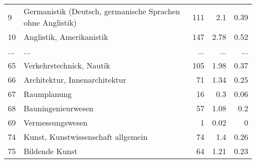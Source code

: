 \begin{longtable}{lXrrr}
        9 & \multicolumn{1}{X}{Germanistik (Deutsch, germanische Sprachen ohne Anglistik)} & %
          \num{111} &
          \num[round-mode=places,round-precision=2]{2,1} &
          \num[round-mode=places,round-precision=2]{0,39} \\
        10 & \multicolumn{1}{X}{Anglistik, Amerikanistik} & %
          \num{147} &
          \num[round-mode=places,round-precision=2]{2,78} &
          \num[round-mode=places,round-precision=2]{0,52} \\
       ... & ... & ... & ... & ... \\
        65 & \multicolumn{1}{X}{Verkehrstechnick, Nautik} & %
          \num{105} &
          \num[round-mode=places,round-precision=2]{1,98} &
          \num[round-mode=places,round-precision=2]{0,37} \\

        66 & \multicolumn{1}{X}{Architektur, Innenarchitektur} & %
          \num{71} &
          \num[round-mode=places,round-precision=2]{1,34} &
          \num[round-mode=places,round-precision=2]{0,25} \\

        67 & \multicolumn{1}{X}{Raumplanung} & %
          \num{16} &
          \num[round-mode=places,round-precision=2]{0,3} &
          \num[round-mode=places,round-precision=2]{0,06} \\

        68 & \multicolumn{1}{X}{Bauningenieurwesen} & %
          \num{57} &
          \num[round-mode=places,round-precision=2]{1,08} &
          \num[round-mode=places,round-precision=2]{0,2} \\

        69 & \multicolumn{1}{X}{Vermessungswesen} & %
          \num{1} &
          \num[round-mode=places,round-precision=2]{0,02} &
          \num[round-mode=places,round-precision=2]{0} \\

        74 & \multicolumn{1}{X}{Kunst, Kunstwissenschaft allgemein} & %
          \num{74} &
          \num[round-mode=places,round-precision=2]{1,4} &
          \num[round-mode=places,round-precision=2]{0,26} \\

        75 & \multicolumn{1}{X}{Bildende Kunst} & %
          \num{64} &
          \num[round-mode=places,round-precision=2]{1,21} &
          \num[round-mode=places,round-precision=2]{0,23} \\


\end{longtable}
